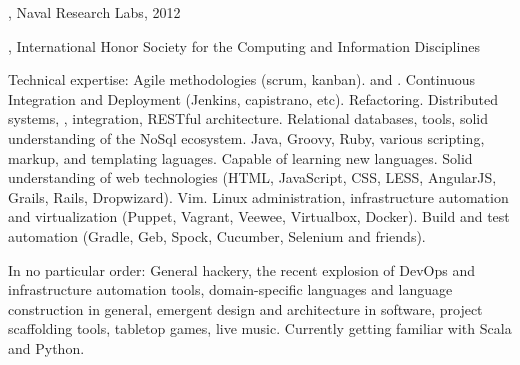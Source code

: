 \documentclass[10pt,a4paper]{article}
\begin{document}
, Naval Research Labs, 2012

\noindent{}, International Honor Society for the Computing and Information Disciplines
\vspace{0.5em}
\spacedhrule{0.5em}{-0.4em}


\inlineheadsection  %
  {Technical expertise:}
  {
    Agile methodologies (scrum, kanban).
     and .
    Continuous Integration and Deployment (Jenkins, capistrano, etc).
    Refactoring.
    Distributed systems, , integration, RESTful architecture.
    Relational databases,  tools, solid understanding of the NoSql ecosystem.
    Java, Groovy, Ruby, various scripting, markup, and templating laguages.  Capable of learning new languages.
    Solid understanding of web technologies (HTML, JavaScript, CSS, LESS, AngularJS, Grails, Rails, Dropwizard).
    Vim. Linux administration, infrastructure automation and virtualization (Puppet, Vagrant, Veewee, Virtualbox, Docker).
    Build and test automation (Gradle, Geb, Spock, Cucumber, Selenium and friends).
  }

\spacedhrule{1.6em}{-0.4em}

\inlineheadsection
  {In no particular order:}
  {
    General hackery, the recent explosion of DevOps and infrastructure automation tools, domain-specific languages and language construction in general,
    emergent design and architecture in software, project scaffolding tools, tabletop games, live music.  Currently getting familiar with Scala and Python.
  }
\end{document}
